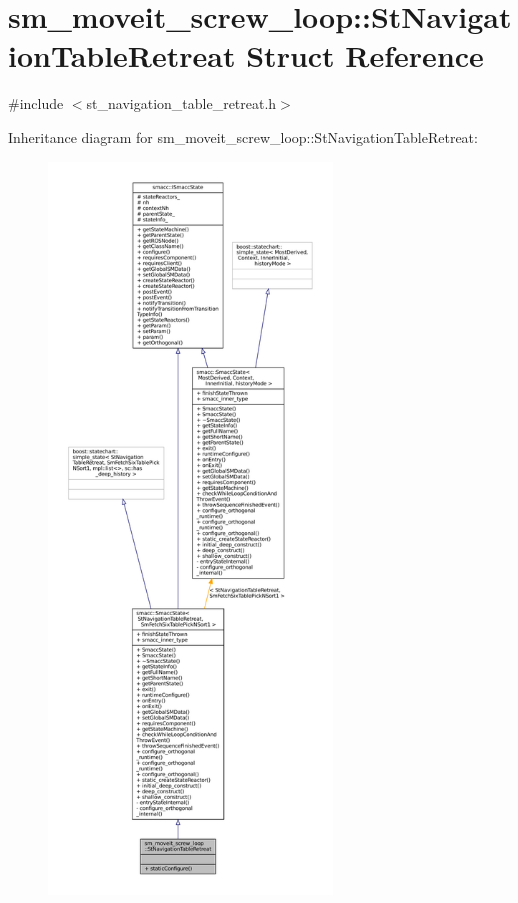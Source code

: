 \hypertarget{structsm__moveit__screw__loop_1_1StNavigationTableRetreat}{}\section{sm\+\_\+moveit\+\_\+screw\+\_\+loop\+:\+:St\+Navigation\+Table\+Retreat Struct Reference}
\label{structsm__moveit__screw__loop_1_1StNavigationTableRetreat}


{\ttfamily \#include $<$st\+\_\+navigation\+\_\+table\+\_\+retreat.\+h$>$}



Inheritance diagram for sm\+\_\+moveit\+\_\+screw\+\_\+loop\+:\+:St\+Navigation\+Table\+Retreat\+:
\nopagebreak
\begin{figure}[H]
\begin{center}
\leavevmode
\includegraphics[height=550pt]{structsm__moveit__screw__loop_1_1StNavigationTableRetreat__inherit__graph}
\end{center}
\end{figure}


